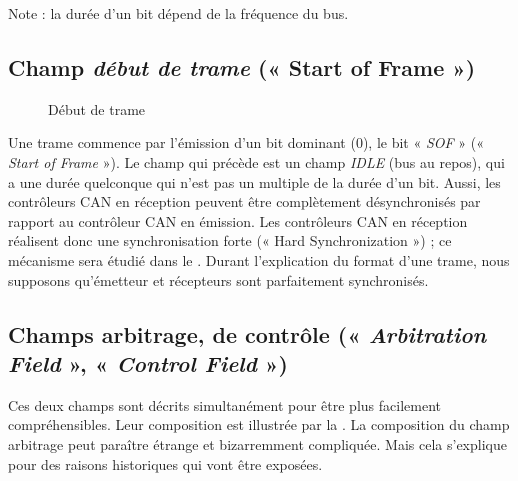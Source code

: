 Note : la durée d'un bit dépend de la fréquence du bus.









\subsection{Champ \emph{début de trame} (« Start of Frame »)}

\begin{figure}[h]
  \centering
  \caption{Début de trame}
\end{figure}

Une trame commence par l'émission d'un bit dominant ($0$), le bit « \emph{SOF} » (« \emph{Start of Frame} »). Le champ qui précède est un champ \emph{IDLE} (bus au repos), qui a une durée quelconque qui n'est pas un multiple de la durée d'un bit. Aussi, les contrôleurs CAN en réception peuvent être complètement désynchronisés par rapport au contrôleur CAN en émission. Les contrôleurs CAN en réception réalisent donc une synchronisation forte (« Hard Synchronization ») ; ce mécanisme sera étudié dans le . Durant l'explication du format d'une trame, nous supposons qu'émetteur et récepteurs sont parfaitement synchronisés.










\subsection{Champs arbitrage, de contrôle (« \emph{Arbitration Field} », « \emph{Control Field} »)}

Ces deux champs sont décrits simultanément pour être plus facilement compréhensibles. Leur composition est illustrée par la . La composition du champ arbitrage peut paraître étrange et bizarremment compliquée. Mais cela s'explique pour des raisons historiques qui vont être exposées.

